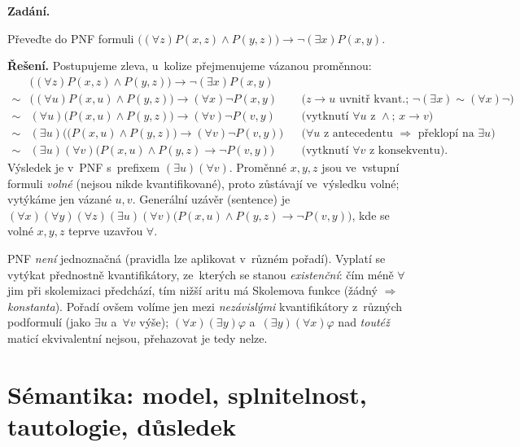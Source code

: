 \documentclass[11pt,a4paper]{article}
\begin{document}
\begin{priklad}
\textbf{Zadání.}\par
Převeďte do PNF formuli $\big((\forall z)P(x,z)\wedge P(y,z)\big)\to\neg(\exists x)P(x,y)$.

\smallskip
\textbf{Řešení.} Postupujeme zleva, u~kolize přejmenujeme vázanou proměnnou:
\begin{align*}
&\big((\forall z)P(x,z)\wedge P(y,z)\big)\to\neg(\exists x)P(x,y)\\
\sim{}&\big((\forall u)P(x,u)\wedge P(y,z)\big)\to(\forall x)\neg P(x,y)
&&\text{($z\!\to\! u$ uvnitř kvant.; $\neg(\exists x)\sim(\forall x)\neg$)}\\
\sim{}&(\forall u)\big(P(x,u)\wedge P(y,z)\big)\to(\forall v)\neg P(v,y)
&&\text{(vytknutí $\forall u$ z~$\wedge$; $x\!\to\! v$)}\\
\sim{}&(\exists u)\Big(\big(P(x,u)\wedge P(y,z)\big)\to(\forall v)\neg P(v,y)\Big)
&&\text{($\forall u$ z~antecedentu $\Rightarrow$ překlopí na~$\exists u$)}\\
\sim{}&(\exists u)(\forall v)\big(P(x,u)\wedge P(y,z)\to\neg P(v,y)\big)
&&\text{(vytknutí $\forall v$ z~konsekventu).}
\end{align*}
Výsledek je v~PNF s~prefixem $(\exists u)(\forall v)$. Proměnné $x,y,z$ jsou ve~vstupní formuli \emph{volné} (nejsou nikde kvantifikované), proto zůstávají ve~výsledku volné; vytýkáme jen vázané $u,v$. Generální uzávěr (sentence) je
$(\forall x)(\forall y)(\forall z)(\exists u)(\forall v)\big(P(x,u)\wedge P(y,z)\to\neg P(v,y)\big)$, kde se volné $x,y,z$ teprve uzavřou $\forall$.
\end{priklad}

\begin{poznamka}
PNF \emph{není} jednoznačná (pravidla lze aplikovat v~různém pořadí). Vyplatí se vytýkat přednostně kvantifikátory, ze~kterých se stanou \emph{existenční}: čím méně $\forall$ jim při skolemizaci předchází, tím nižší aritu má Skolemova funkce (žádný $\Rightarrow$ \emph{konstanta}). Pořadí ovšem volíme jen mezi \emph{nezávislými} kvantifikátory z~různých podformulí (jako $\exists u$ a~$\forall v$ výše); $(\forall x)(\exists y)\varphi$ a~$(\exists y)(\forall x)\varphi$ nad \emph{toutéž} maticí ekvivalentní nejsou, přehazovat je tedy nelze.
\end{poznamka}

\section{Sémantika: model, splnitelnost, tautologie, důsledek}
\end{document}
